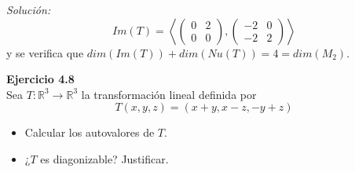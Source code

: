 \documentclass{article}
\newenvironment{problem}[2][Ejercicio]
    { \begin{mdframed}[backgroundcolor=gray!20] \textbf{#1 #2} \\}
    {  \end{mdframed}}
\newenvironment{solution}
    {\textit{Solución:}}
    {}
\begin{document}
\begin{solution}
\[
Im(T) = \left \langle \begin{pmatrix} 0 & 2 \\ 0 & 0 \end{pmatrix}, \begin{pmatrix} -2 & 0 \\ -2 & 2 \end{pmatrix}  \right \rangle
\]
y se verifica que $dim(Im(T))+dim(Nu(T))=4=dim(M_2)$.
\end{solution}

\begin{problem}{4.8}
    Sea $T: \mathbb{R}^3 \to \mathbb{R}^3$ la transformación lineal definida por
\[
T(x,y,z) = (x+y,x-z,-y+z)
\]\begin{itemize}
\item 
Calcular los autovalores de $T$.
\item 
¿$T$ es diagonizable? Justificar.
\end{itemize}
\end{problem}
\end{document}
